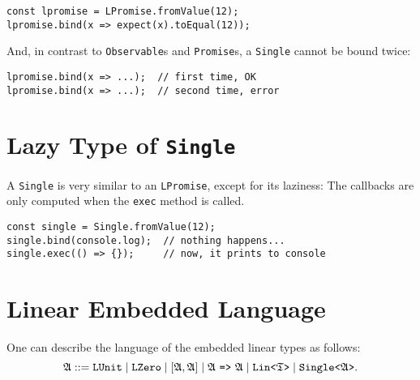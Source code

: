 \begin{verbatim}
const lpromise = LPromise.fromValue(12);
lpromise.bind(x => expect(x).toEqual(12));
\end{verbatim}

And, in contrast to \texttt{Observable}s and \texttt{Promise}s, a \texttt{Single} cannot be bound twice:

\begin{verbatim}
lpromise.bind(x => ...);  // first time, OK
lpromise.bind(x => ...);  // second time, error
\end{verbatim}

\section{Lazy Type of \texttt{Single}}

A \texttt{Single} is very similar to an \texttt{LPromise}, except for its laziness: The callbacks are only computed when the \texttt{exec} method is called.

\begin{verbatim}
const single = Single.fromValue(12);
single.bind(console.log);  // nothing happens...
single.exec(() => {});     // now, it prints to console
\end{verbatim}

\section{Linear Embedded Language}
One can describe the language of the embedded linear types as follows:
\[
\mathfrak{A} ::= \mathtt{LUnit} \mid \mathtt{LZero} \mid \mathtt{[}\mathfrak{A}, \mathfrak{A}\mathtt{]} \mid \mathfrak{A}\mbox{~\texttt{=>}~} \mathfrak{A} \mid \mbox{\texttt{Lin<}}\mathfrak{T}\mbox{\texttt{>}} \mid \mbox{\texttt{Single<}}\mathfrak{A}\mbox{\texttt{>}}.
\]